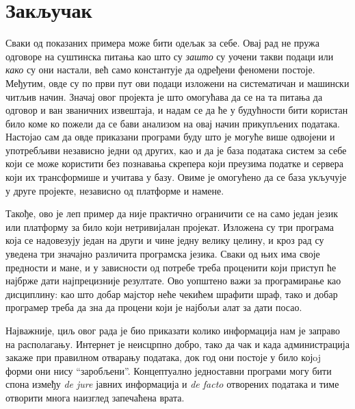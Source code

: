 \section{Закључак}
Сваки од показаних примера може бити одељак за себе. Овај рад не пружа одговоре на суштинска питања као што су \emph{зашто} су уочени такви подаци или \emph{како} су они настали, већ само константује да одређени феномени постоје. Међутим, овде су по први пут ови подаци изложени на систематичан и машински читљив начин. Значај овог пројекта је што омогућава да се на та питања да одговор и ван званичних извештаја, и надам се да ће у будућности бити користан било коме ко пожели да се бави анализом на овај начин прикупљених података. Настојао сам да овде приказани програми буду што је могуће више одвојени и употребљиви независно једни од других, као и да је база података систем за себе који се може користити без познавања скрепера који преузима податке и сервера који их трансформише и учитава у базу. Овиме је омогућено да се база укључује у друге пројекте, независно од платформе и намене.

Такође, ово је леп пример да није практично ограничити се на само један језик или платформу за било који нетривијалан пројекат. Изложена су три програма која се надовезују један на други и чине једну велику целину, и кроз рад су уведена три значајно различита програмска језика. Сваки од њих има своје предности и мане, и у зависности од потребе треба проценити који приступ ће најбрже дати најпрецизније резултате. Ово уопштено важи за програмирање као дисциплину: као што добар мајстор неће чекићем шрафити шраф, тако и добар програмер треба да зна да процени који је најбољи алат за дати посао.

Најважније, циљ овог рада је био приказати колико информација нам је заправо на располагању. Интернет је неисцрпно добро, тако да чак и када администрација закаже при правилном отварању података, док год они постоје у било којoj форми они нису \enquote{заробљени}. Концептуално једноставни програми могу бити спона између \emph{de jure} јавних информација и \emph{de facto} отворених података и тиме отворити многа наизглед запечаћена врата.